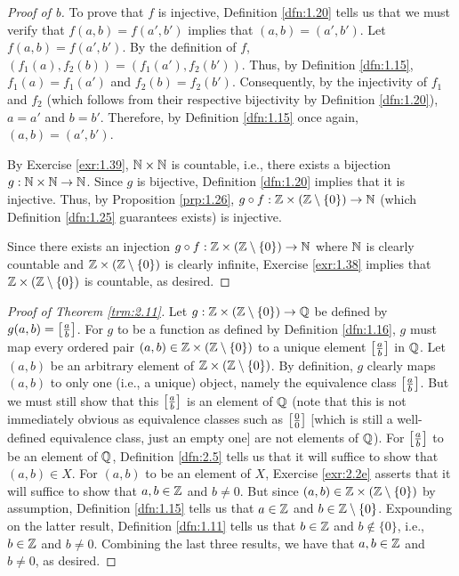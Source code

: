 \documentclass[../main.tex]{subfiles}
\begin{document}
\begin{theorem}
\begin{lemma*}
\begin{proof}[Proof of b]
            To prove that $f$ is injective, Definition \ref{dfn:1.20} tells us that we must verify that $f(a,b)=f(a',b')$ implies that $(a,b)=(a',b')$. Let $f(a,b)=f(a',b')$. By the definition of $f$, $(f_1(a),f_2(b))=(f_1(a'),f_2(b'))$. Thus, by Definition \ref{dfn:1.15}, $f_1(a)=f_1(a')$ and $f_2(b)=f_2(b')$. Consequently, by the injectivity of $f_1$ and $f_2$ (which follows from their respective bijectivity by Definition \ref{dfn:1.20}), $a=a'$ and $b=b'$. Therefore, by Definition \ref{dfn:1.15} once again, $(a,b)=(a',b')$.\par
            By Exercise \ref{exr:1.39}, $\mathbb{N}\times\mathbb{N}$ is countable, i.e., there exists a bijection $g:\mathbb{N}\times\mathbb{N}\to\mathbb{N}$. Since $g$ is bijective, Definition \ref{dfn:1.20} implies that it is injective. Thus, by Proposition \ref{prp:1.26}, $g\circ f:\mathbb{Z}\times(\mathbb{Z}\setminus\{0\})\to\mathbb{N}$ (which Definition \ref{dfn:1.25} guarantees exists) is injective.\par
            Since there exists an injection $g\circ f:\mathbb{Z}\times(\mathbb{Z}\setminus\{0\})\to\mathbb{N}$ where $\mathbb{N}$ is clearly countable and $\mathbb{Z}\times(\mathbb{Z}\setminus\{0\})$ is clearly infinite, Exercise \ref{exr:1.38} implies that $\mathbb{Z}\times(\mathbb{Z}\setminus\{0\})$ is countable, as desired.
        \end{proof}
    \end{lemma*}
    \begin{proof}[Proof of Theorem \ref{trm:2.11}]
        Let $g:\mathbb{Z}\times(\mathbb{Z}\setminus\{0\})\to\mathbb{Q}$ be defined by $g(a,b)=\left[ \frac{a}{b} \right]$. For $g$ to be a function as defined by Definition \ref{dfn:1.16}, $g$ must map every ordered pair $(a,b)\in\mathbb{Z}\times(\mathbb{Z}\setminus\{0\})$ to a unique element $\left[ \frac{a}{b} \right]$ in $\mathbb{Q}$. Let $(a,b)$ be an arbitrary element of $\mathbb{Z}\times(\mathbb{Z}\setminus\{0\})$. By definition, $g$ clearly maps $(a,b)$ to only one (i.e., a unique) object, namely the equivalence class $\left[ \frac{a}{b} \right]$. But we must still show that this $\left[ \frac{a}{b} \right]$ is an element of $\mathbb{Q}$ (note that this is not immediately obvious as equivalence classes such as $\left[ \frac{0}{0} \right]$ [which is still a well-defined equivalence class, just an empty one] are not elements of $\mathbb{Q}$). For $\left[ \frac{a}{b} \right]$ to be an element of $\mathbb{Q}$, Definition \ref{dfn:2.5} tells us that it will suffice to show that $(a,b)\in X$. For $(a,b)$ to be an element of $X$, Exercise \ref{exr:2.2e} asserts that it will suffice to show that $a,b\in\mathbb{Z}$ and $b\neq 0$. But since $(a,b)\in\mathbb{Z}\times(\mathbb{Z}\setminus\{0\})$ by assumption, Definition \ref{dfn:1.15} tells us that $a\in\mathbb{Z}$ and $b\in\mathbb{Z}\setminus\{0\}$. Expounding on the latter result, Definition \ref{dfn:1.11} tells us that $b\in\mathbb{Z}$ and $b\notin\{0\}$, i.e., $b\in\mathbb{Z}$ and $b\neq 0$. Combining the last three results, we have that $a,b\in\mathbb{Z}$ and $b\neq 0$, as desired.\par

\end{proof}
\end{theorem}
\end{document}
